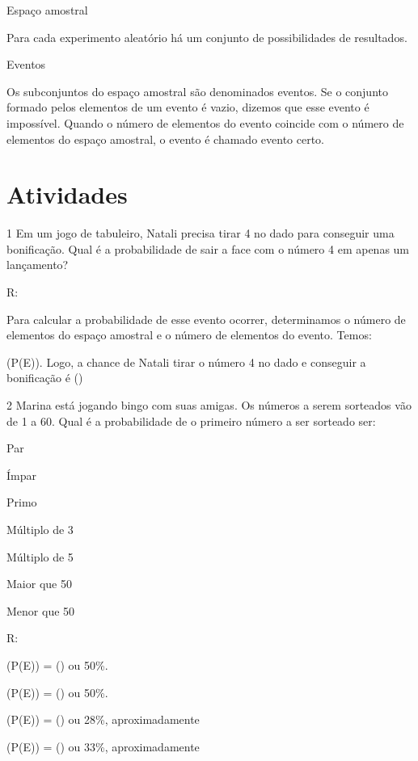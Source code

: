{Espaço amostral

Para cada experimento aleatório há um conjunto de possibilidades de
resultados.

Eventos

Os subconjuntos do espaço amostral são denominados eventos. Se o
conjunto formado pelos elementos de um evento é vazio, dizemos que esse
evento é impossível. Quando o número de elementos do evento coincide com
o número de elementos do espaço amostral, o evento é chamado evento
certo.

\section{Atividades}

\num{1} Em um jogo de tabuleiro, Natali precisa tirar 4 no dado para
conseguir uma bonificação. Qual é a probabilidade de sair a face com o
número 4 em apenas um lançamento?

R:

Para calcular a probabilidade de esse evento ocorrer, determinamos o
número de elementos do espaço amostral e o número de elementos do
evento. Temos:

(P(E)). Logo, a chance de Natali tirar o número 4 no
dado e conseguir a bonificação é ()

\num{2} Marina está jogando bingo com suas amigas. Os números a serem
sorteados vão de 1 a 60. Qual é a probabilidade de o primeiro número a
ser sorteado ser:
\item Par
\item Ímpar
\item Primo
\item Múltiplo de 3
\item Múltiplo de 5
\item Maior que 50
\item Menor que 50

R:
\item

(P(E)) = () ou 50\%.
\item

(P(E)) = () ou 50\%.
\item

(P(E)) = () ou 28\%, aproximadamente
\item

(P(E)) = () ou 33\%, aproximadamente
\item

}
